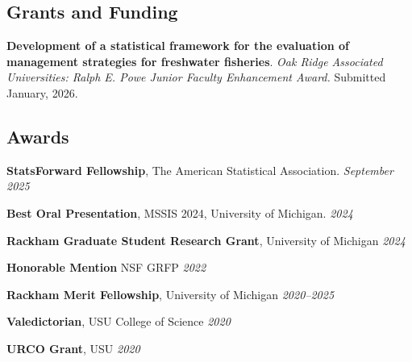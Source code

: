 \documentclass[11pt]{article}
\begin{document}
\subsection*{Grants and Funding}

\noindent \textbf{Development of a statistical framework for the evaluation of management strategies for freshwater fisheries}. {\it Oak Ridge Associated Universities: Ralph E. Powe Junior Faculty Enhancement Award.} Submitted January, 2026.

\subsection*{Awards}

\noindent\hspace{5mm}\textbf{StatsForward Fellowship}, The American Statistical Association. \hfill{\textit{September 2025}}

\vspace{2mm}
\noindent\hspace{5mm}\textbf{Best Oral Presentation}, MSSIS 2024, University of Michigan. \hfill {\textit{2024}}

\hspace{5mm}{\it Award amount: $\$200$}


\vspace{2mm}
\noindent\hspace{5mm}\textbf{Rackham Graduate Student Research Grant}, University of Michigan \hfill {\textit{2024}}

\hspace{5mm}{\it Award amount: $\$2500$}

\vspace{2mm}
\noindent\hspace{5mm}\textbf{Honorable Mention} NSF GRFP \hfill {\textit{2022}}

\vspace{2mm}
\noindent\hspace{5mm}\textbf{Rackham Merit Fellowship}, University of Michigan \hfill {\textit{2020--2025}}

\hspace{5mm}{\it Award amount: Three years of PhD student funding.}

\vspace{2mm}
\noindent\hspace{5mm}\textbf{Valedictorian}, USU College of Science \hfill {\textit{2020}}

\vspace{2mm}
\noindent\hspace{5mm}\textbf{URCO Grant}, USU \hfill  {\textit{2020}}
\end{document}
